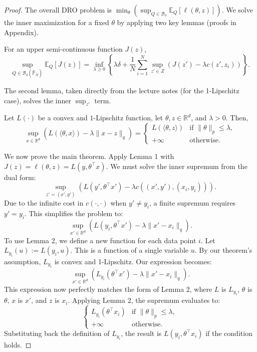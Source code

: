 \documentclass[12pt]{report}
\newcommand{\coloneqq}{\mathrel{:=}}
\begin{document}
\begin{proof}
The overall DRO problem is $\min_\theta \left( \sup_{Q \in \mathcal{B}_\delta} \mathbb{E}_Q[\ell(\theta, z)] \right)$. 
We solve the inner maximization for a fixed $\theta$ by applying two key lemmas (proofs in Appendix).

\begin{lemma}
For an upper semi-continuous function $J(z)$,
\[
\sup_{Q \in \mathcal{B}_\delta(\hat{\mathbb{P}}_N)} \mathbb{E}_Q[J(z)] = \inf_{\lambda \ge 0} \left\{ \lambda\delta + \frac{1}{N}\sum_{i=1}^N \sup_{z' \in Z} \left( J(z') - \lambda c(z', z_i) \right) \right\}.
\]
\end{lemma}

The second lemma, taken directly from the lecture notes (for the 1-Lipschitz case), solves the inner $\sup_{z'}$ term.
\begin{lemma}
Let $L(\cdot)$ be a convex and $1$-Lipschitz function, let $\theta, z \in \mathbb{R}^d$, and $\lambda > 0$. Then,
\[
\sup_{x \in \mathbb{R}^d} \left( L(\langle \theta, x \rangle) - \lambda \|x - z\|_q \right) = 
\begin{cases}
    L(\langle \theta, z \rangle) & \text{if } \|\theta\|_p \le \lambda, \\
    +\infty & \text{otherwise}.
\end{cases}
\]
\end{lemma}

We now prove the main theorem. Apply Lemma 1 with $J(z) = \ell(\theta, z) = L(y, \theta^\top x)$. We must solve the inner supremum from the dual form:
\[
\sup_{z'=(x',y')} \left( L(y', \theta^\top x') - \lambda c((x',y'), (x_i,y_i)) \right).
\]
Due to the infinite cost in $c(\cdot, \cdot)$ when $y' \neq y_i$, a finite supremum requires $y'=y_i$. This simplifies the problem to:
\[
\sup_{x' \in \mathbb{R}^d} \left( L(y_i, \theta^\top x') - \lambda \|x' - x_i\|_q \right).
\]
To use Lemma 2, we define a new function for each data point $i$. Let $L_{y_i}(u) \coloneqq L(y_i, u)$. This is a function of a single variable $u$. 
By our theorem's assumption, $L_{y_i}$ is convex and 1-Lipschitz. Our expression becomes:
\[
\sup_{x' \in \mathbb{R}^d} \left( L_{y_i}(\theta^\top x') - \lambda \|x' - x_i\|_q \right).
\]
This expression now perfectly matches the form of Lemma 2, where $L$ is $L_{y_i}$, $\theta$ is $\theta$, $x$ is $x'$, and $z$ is $x_i$.
Applying Lemma 2, the supremum evaluates to:
\[
\begin{cases}
    L_{y_i}(\theta^\top x_i) & \text{if } \|\theta\|_p \le \lambda, \\
    +\infty & \text{otherwise}.
\end{cases}
\]
Substituting back the definition of $L_{y_i}$, the result is $L(y_i, \theta^\top x_i)$ if the condition holds.


\end{proof}
\end{document}

